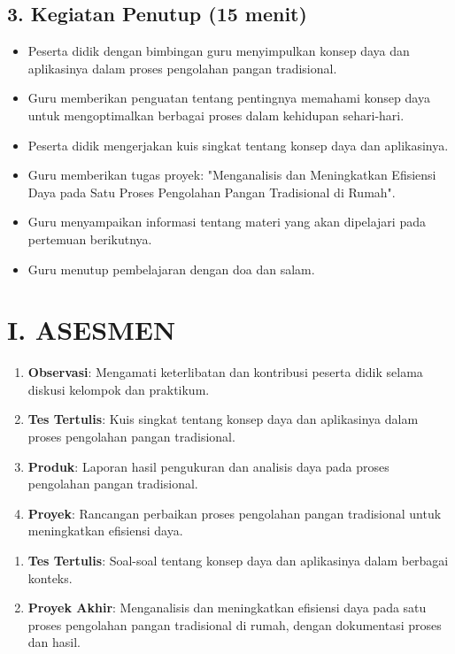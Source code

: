 \documentclass[12pt,a4paper]{article}
\begin{document}
\subsection*{3. Kegiatan Penutup (15 menit)}
\begin{itemize}[leftmargin=*]
    \item Peserta didik dengan bimbingan guru menyimpulkan konsep daya dan aplikasinya dalam proses pengolahan pangan tradisional.
    \item Guru memberikan penguatan tentang pentingnya memahami konsep daya untuk mengoptimalkan berbagai proses dalam kehidupan sehari-hari.
    \item Peserta didik mengerjakan kuis singkat tentang konsep daya dan aplikasinya.
    \item Guru memberikan tugas proyek: "Menganalisis dan Meningkatkan Efisiensi Daya pada Satu Proses Pengolahan Pangan Tradisional di Rumah".
    \item Guru menyampaikan informasi tentang materi yang akan dipelajari pada pertemuan berikutnya.
    \item Guru menutup pembelajaran dengan doa dan salam.
\end{itemize}

\section*{I. ASESMEN}
\begin{tcolorbox}[colback=white,colframe=black,title=Asesmen Formatif,boxrule=1pt]
\begin{enumerate}[leftmargin=*]
    \item \textbf{Observasi}: Mengamati keterlibatan dan kontribusi peserta didik selama diskusi kelompok dan praktikum.
    \item \textbf{Tes Tertulis}: Kuis singkat tentang konsep daya dan aplikasinya dalam proses pengolahan pangan tradisional.
    \item \textbf{Produk}: Laporan hasil pengukuran dan analisis daya pada proses pengolahan pangan tradisional.
    \item \textbf{Proyek}: Rancangan perbaikan proses pengolahan pangan tradisional untuk meningkatkan efisiensi daya.
\end{enumerate}
\end{tcolorbox}

\begin{tcolorbox}[colback=white,colframe=black,title=Asesmen Sumatif,boxrule=1pt]
\begin{enumerate}[leftmargin=*]
    \item \textbf{Tes Tertulis}: Soal-soal tentang konsep daya dan aplikasinya dalam berbagai konteks.
    \item \textbf{Proyek Akhir}: Menganalisis dan meningkatkan efisiensi daya pada satu proses pengolahan pangan tradisional di rumah, dengan dokumentasi proses dan hasil.
\end{enumerate}
\end{tcolorbox}
\end{document}
